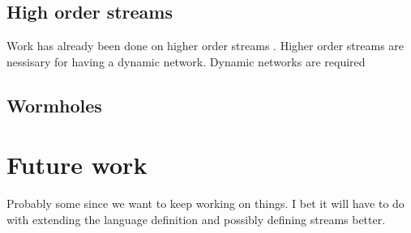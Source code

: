\documentclass[twocolumn]{paper}
\begin{document}
\subsection{High order streams}
Work has already been done on higher order streams \cite{HighOrderStreams}. Higher order streams are nessisary for having a dynamic network. Dynamic networks are required
\subsection{Wormholes}
\cite{WinogradCort2012HS}
\section{Future work}
Probably some since we want to keep working on things. I bet it will have to do with extending the language definition and possibly defining streams better.




\end{document}
